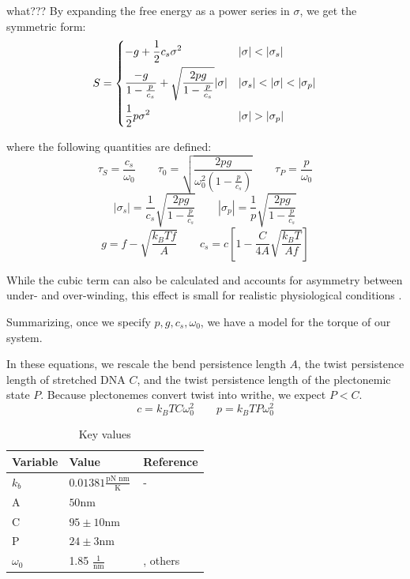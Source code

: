 \documentclass[11pt]{article}
\newcommand{\units}[2]{\frac{\text{#1}}{\text{#2}}\,}
\begin{document}
what???
By expanding the free energy as a power series in \(\sigma\), we get the symmetric form:
\begin{equation}
    S = \begin{dcases}
        -g + \frac{1}{2} c_s \sigma^2 & |\sigma| < |\sigma_s| \\
        \frac{-g}{1 - \frac{p}{c_s}} + \sqrt{\frac{2 p g}{1 - \frac{p}{c_s}}} |\sigma| & |\sigma_s| < |\sigma| < |\sigma_p| \\
        \frac{1}{2} p \sigma^2 & |\sigma| > |\sigma_p|
    \end{dcases}
\end{equation}

where the following quantities are defined:
\[\tau_S = \frac{c_s}{\omega_0} \qquad \tau_0 = \sqrt{\frac{2 pg}{\omega_0^2 \left(1 - \frac{p}{c_s}\right)}} \qquad \tau_P = \frac{p}{\omega_0} \]
\[|\sigma_s| = \frac{1}{c_s} \sqrt{\frac{2pg}{1 - \frac{p}{c_s}}} \qquad |\sigma_p| = \frac{1}{p} \sqrt{\frac{2pg}{1 - \frac{p}{c_s}}}\]
\[g = f - \sqrt{\frac{k_B T f}{A}} \qquad c_s = c \left[1 - \frac{C}{4A} \sqrt{\frac{k_B T}{A f}}\right]\]


While the cubic term can also be calculated and accounts for asymmetry between under- and over-winding,  this effect is small for realistic physiological conditions \textcite{markoTorqueDynamicsLinking2007}.


Summarizing, once we specify \(p, g, c_s, \omega_0\), we have a model for the torque of our system.

In these equations, we rescale
the bend persistence length \(A\), the twist persistence length of stretched DNA \(C\), and the twist persistence length of the plectonemic
state \(P\). Because plectonemes convert twist into writhe, we expect \(P < C\).
\[c = k_B T C \omega_0^2 \qquad p = k_B T P \omega_0^2\]

\begin{table}[h]
    \centering
    \begin{tabular}{@{}lll@{}}
        \toprule
        Variable & Value & Reference \\
        \midrule
        \(k_b\) & \(0.01381 \units{pN nm}{K}\) & - \\
        \midrule
        A & \(50\)nm & \parencite{markoTorqueDynamicsLinking2007} \\
        C & \(95 \pm 10\)nm & \parencite{markoTorqueDynamicsLinking2007} \\
        P & \(24 \pm 3\)nm & \parencite{markoTorqueDynamicsLinking2007} \\
        \(\omega_0\) & 1.85 \(\units{1}{nm}\) & \parencite{sevierPropertiesGeneExpression2018}, others \\
        \bottomrule
    \end{tabular}
    \caption{Key values}
    \label{tab:constants}
\end{table}
\end{document}
